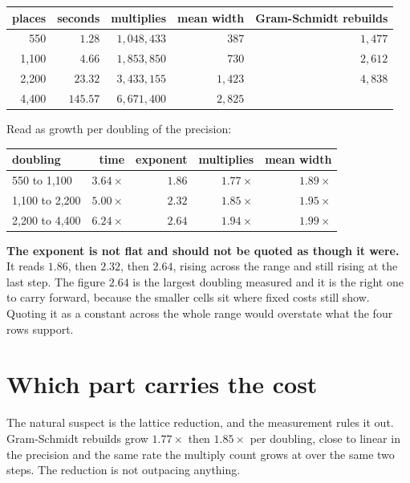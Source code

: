 \begin{center}
\begin{tabular}{@{}rrrrr@{}}
\toprule
places & seconds & multiplies & mean width & Gram-Schmidt rebuilds \\
\midrule
550 & \(1.28\) & \(1{,}048{,}433\) & 387 & \(1{,}477\) \\
1{,}100 & \(4.66\) & \(1{,}853{,}850\) & 730 & \(2{,}612\) \\
2{,}200 & \(23.32\) & \(3{,}433{,}155\) & \(1{,}423\) & \(4{,}838\) \\
4{,}400 & \(145.57\) & \(6{,}671{,}400\) & \(2{,}825\) & \textemdash{} \\
\bottomrule
\end{tabular}
\end{center}

Read as growth per doubling of the precision:

\begin{center}
\begin{tabular}{@{}lrrrr@{}}
\toprule
doubling & time & exponent & multiplies & mean width \\
\midrule
550 to 1{,}100 & \(3.64\times\) & \(1.86\) & \(1.77\times\) & \(1.89\times\) \\
1{,}100 to 2{,}200 & \(5.00\times\) & \(2.32\) & \(1.85\times\) & \(1.95\times\) \\
2{,}200 to 4{,}400 & \(6.24\times\) & \(2.64\) & \(1.94\times\) & \(1.99\times\) \\
\bottomrule
\end{tabular}
\end{center}

\textbf{The exponent is not flat and should not be quoted as though it were.} It reads \(1.86\), then
\(2.32\), then \(2.64\), rising across the range and still rising at the last step. The figure
\(2.64\) is the largest doubling measured and it is the right one to carry forward, because the
smaller cells sit where fixed costs still show. Quoting it as a constant across the whole range would
overstate what the four rows support.

\section{Which part carries the cost}

The natural suspect is the lattice reduction, and the measurement rules it out. Gram-Schmidt rebuilds
grow \(1.77\times\) then \(1.85\times\) per doubling, close to linear in the precision and the same
rate the multiply count grows at over the same two steps. The reduction is not outpacing anything.

